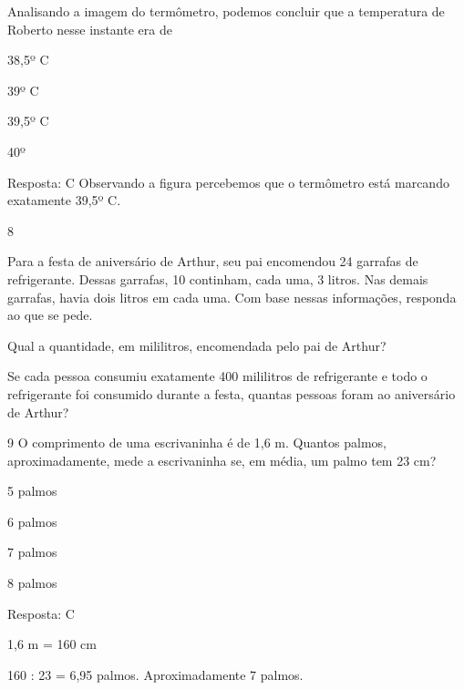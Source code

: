 \begin{escolha}

Analisando a imagem do termômetro, podemos concluir que a temperatura de Roberto nesse instante era de

\begin{escolha}

\item
  38,5º C
\item
  39º C
\item
  39,5º C
\item
  40º
\end{escolha}

Resposta: C
Observando a figura percebemos que o termômetro está marcando exatamente
39,5º C.

\num{8}

Para a festa de aniversário de Arthur, seu pai encomendou 24 garrafas de
refrigerante. Dessas garrafas, 10 continham, cada uma, 3 litros. Nas
demais garrafas, havia dois litros em cada uma. Com base nessas
informações, responda ao que se pede.

\begin{escolha}

\item
  Qual a quantidade, em mililitros, encomendada pelo pai de Arthur?

\item
  Se cada pessoa consumiu exatamente 400 mililitros de refrigerante e
  todo o refrigerante foi consumido durante a festa, quantas pessoas
  foram ao aniversário de Arthur?

\end{escolha}

\num{9} O comprimento de uma escrivaninha é de 1,6 m. Quantos palmos,
aproximadamente, mede a escrivaninha se, em média, um palmo tem 23 cm?

\begin{escolha}

\item
  5 palmos
\item
  6 palmos
\item
  7 palmos
\item
  8 palmos
\end{escolha}

Resposta: C

1,6 m = 160 cm

160 : 23 = 6,95 palmos. Aproximadamente 7 palmos.


\end{escolha}
